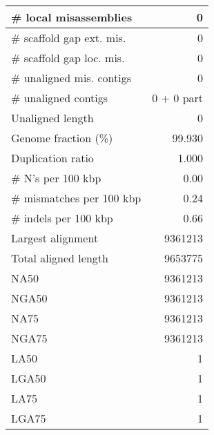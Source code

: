 \documentclass[12pt,a4paper]{article}
\begin{document}
\begin{table}[ht]
\begin{center}
\begin{tabular}{|l*{1}{|r}|}
\# local misassemblies & 0 \\ \hline
\# scaffold gap ext. mis. & 0 \\ \hline
\# scaffold gap loc. mis. & 0 \\ \hline
\# unaligned mis. contigs & 0 \\ \hline
\# unaligned contigs & 0 + 0 part \\ \hline
Unaligned length & 0 \\ \hline
Genome fraction (\%) & 99.930 \\ \hline
Duplication ratio & 1.000 \\ \hline
\# N's per 100 kbp & 0.00 \\ \hline
\# mismatches per 100 kbp & 0.24 \\ \hline
\# indels per 100 kbp & 0.66 \\ \hline
Largest alignment & 9361213 \\ \hline
Total aligned length & 9653775 \\ \hline
NA50 & 9361213 \\ \hline
NGA50 & 9361213 \\ \hline
NA75 & 9361213 \\ \hline
NGA75 & 9361213 \\ \hline
LA50 & 1 \\ \hline
LGA50 & 1 \\ \hline
LA75 & 1 \\ \hline
LGA75 & 1 \\ \hline
\end{tabular}
\end{center}
\end{table}
\end{document}
